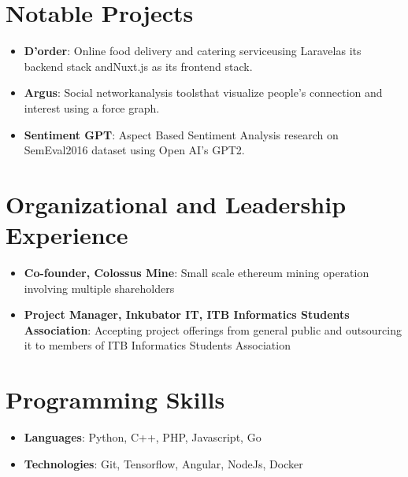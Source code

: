 \documentclass[letterpaper,11pt]{article}
\newcommand{\resumeItem}[2]{
  \item\small{
    \textbf{#1}{: #2 \vspace{-2pt}}
  }
}
\newcommand{\resumeSubItem}[2]{\resumeItem{#1}{#2}\vspace{-4pt}}
\newcommand{\resumeSubHeadingListStart}{\begin{itemize}[leftmargin=*]}
\newcommand{\resumeSubHeadingListEnd}{\end{itemize}}
\begin{document}
\section{Notable Projects}
  \resumeSubHeadingListStart
    \resumeSubItem{D’order}
      {Online food delivery and catering serviceusing Laravelas its backend stack andNuxt.js as its frontend stack.}
    \resumeSubItem{Argus}
      {Social networkanalysis toolsthat visualize people’s connection and interest using a force graph.}
    \resumeSubItem{Sentiment GPT}
      {Aspect Based Sentiment Analysis research on SemEval2016 dataset using Open AI's GPT2.}
  \resumeSubHeadingListEnd 



\section{Organizational and Leadership Experience}
  \resumeSubHeadingListStart
    \resumeSubItem{Co-founder, Colossus Mine}
      {Small scale ethereum mining operation involving multiple shareholders}
    \resumeSubItem{Project Manager, Inkubator IT, ITB Informatics Students Association}
      {Accepting project offerings from general public and outsourcing it to members of ITB Informatics Students Association}
  \resumeSubHeadingListEnd 
  



\section{Programming Skills}
 \resumeSubHeadingListStart
   \item{
      \textbf{Languages}{: Python, C++, PHP, Javascript, Go}      
   }
   \item{
      \textbf{Technologies}{: Git, Tensorflow, Angular, NodeJs, Docker}
   }
 \resumeSubHeadingListEnd


\end{document}
